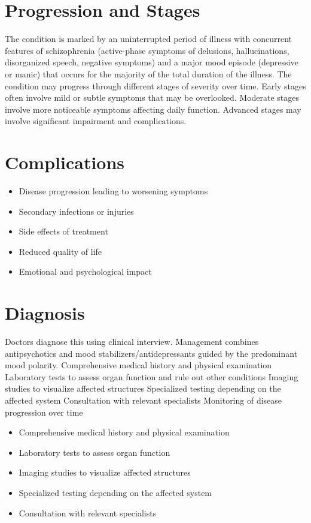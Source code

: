 \section{Progression and Stages}
The condition is marked by an uninterrupted period of illness with concurrent features of schizophrenia (active-phase symptoms of delusions, hallucinations, disorganized speech, negative symptoms) and a major mood episode (depressive or manic) that occurs for the majority of the total duration of the illness. The condition may progress through different stages of severity over time. Early stages often involve mild or subtle symptoms that may be overlooked. Moderate stages involve more noticeable symptoms affecting daily function. Advanced stages may involve significant impairment and complications.
\section{Complications}
\begin{itemize}[noitemsep]
  \item Disease progression leading to worsening symptoms
  \item Secondary infections or injuries
  \item Side effects of treatment
  \item Reduced quality of life
  \item Emotional and psychological impact
\end{itemize}
\section{Diagnosis}
Doctors diagnose this using clinical interview. Management combines antipsychotics and mood stabilizers/antidepressants guided by the predominant mood polarity. Comprehensive medical history and physical examination Laboratory tests to assess organ function and rule out other conditions Imaging studies to visualize affected structures Specialized testing depending on the affected system Consultation with relevant specialists Monitoring of disease progression over time

\begin{itemize}[noitemsep]
  \item Comprehensive medical history and physical examination
  \item Laboratory tests to assess organ function
  \item Imaging studies to visualize affected structures
  \item Specialized testing depending on the affected system
  \item Consultation with relevant specialists
\end{itemize}
